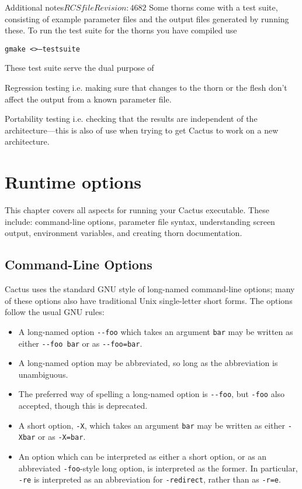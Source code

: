 \begin{cactuspart}{Additional notes}{$RCSfile$}{$Revision: 4682 $}
Some thorns come with a test suite, consisting of example parameter files
and the output files generated by running these. To run the test suite
for the thorns you have compiled use

\texttt{gmake <>--testsuite}

These test suite serve the dual purpose of

\begin{Lentry}
\item [Regression testing]
i.e. making sure that changes to the thorn or the flesh don't affect the
output from a known parameter file.
\item [Portability testing]
i.e. checking that the results are independent of the architecture---this
is also of use when trying to get Cactus to work on a new architecture.
\end{Lentry}


\chapter{Runtime options}

This chapter covers all aspects for running your
Cactus executable.  These include: command-line options, parameter
file syntax, understanding screen output, environment variables, and
creating thorn documentation.

\section{Command-Line Options}
\label{sec:command_line_options}

Cactus uses the standard GNU style of long-named command-line options;
many of these options also have traditional Unix single-letter short forms.
The options follow the usual GNU rules:
\begin{itemize}
\item	A long-named option \verb|--foo| which takes an argument \verb|bar|
	may be written as either \verb|--foo bar| or as \verb|--foo=bar|.
\item	A long-named option may be abbreviated, so long as the abbreviation
	is unambiguous.
\item	The preferred way of spelling a long-named option is \verb|--foo|,
	but \verb|-foo| also accepted, though this is deprecated.
\item	A short option, \verb|-X|, which takes an argument \verb|bar|
	may be written as either \verb|-Xbar| or as \verb|-X=bar|.
\item	An option which can be interpreted as either a short option,
	or as an abbreviated \verb|-foo|-style long option, is interpreted
	as the former.  In particular, \verb|-re| is interpreted as
	an abbreviation for \verb|-redirect|, rather than as \verb|-r=e|.
\end{itemize}


\end{cactuspart}
